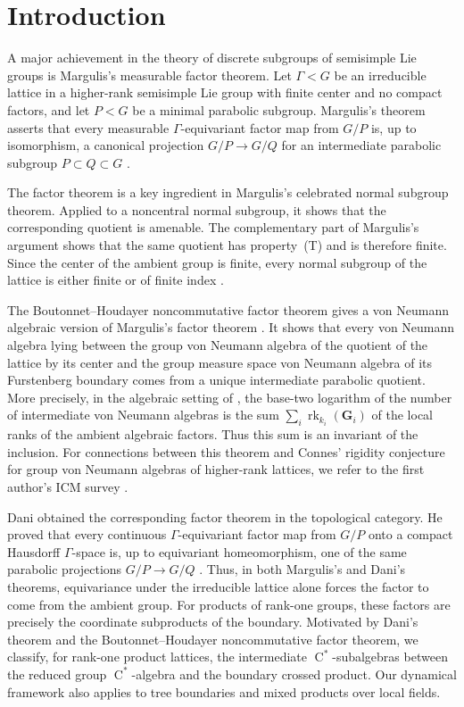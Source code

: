 \documentclass[11pt]{amsart}
\numberwithin{equation}{section}
\newcommand{\rC}{\operatorname{C}}
\newcommand{\rk}{\operatorname{rk}}
\theoremstyle{definition}
\begin{document}
	\section{Introduction}
	
	A major achievement in the theory of discrete subgroups of semisimple Lie
	groups is Margulis's measurable factor theorem. Let $\Gamma<G$ be an
	irreducible lattice in a higher-rank semisimple Lie group with finite center and
	no compact factors, and let $P<G$ be a minimal parabolic subgroup. Margulis's
	theorem asserts that every measurable $\Gamma$-equivariant factor map from
	$G/P$ is, up to isomorphism, a canonical projection $G/P\to G/Q$ for an
	intermediate parabolic subgroup $P\subset Q\subset G$
	\cite[Theorem~IV.2.11(a)]{Ma91}.

	The factor theorem is a key ingredient in Margulis's celebrated normal subgroup
	theorem. Applied to a noncentral normal subgroup, it shows that the corresponding
	quotient is amenable. The complementary part of Margulis's argument shows that
	the same quotient has property~{\rm (T)} and is therefore finite. Since the
	center of the ambient group is finite, every normal subgroup of the lattice is
	either finite or of finite index \cite[Theorem~IV.4.9]{Ma91}.

	The Boutonnet--Houdayer noncommutative factor theorem gives a von Neumann
	algebraic version of Margulis's factor theorem
	\cite[Theorem~B and Theorem~3.3]{BH23}. It shows that every
	von Neumann algebra lying between the group von Neumann algebra of the
	quotient of the lattice by its center and the group measure space von Neumann
	algebra of its Furstenberg boundary comes from a unique intermediate parabolic
	quotient. More precisely, in the algebraic setting of \cite{BH23}, the base-two
	logarithm of the number of intermediate von Neumann algebras is the sum
	\(\sum_i\rk_{k_i}(\mathbf G_i)\) of the local ranks of the ambient algebraic
	factors. Thus this sum is an invariant of
	the inclusion. For connections between this theorem and Connes'\! rigidity
	conjecture for group von Neumann algebras of higher-rank lattices, we refer to
	the first author's ICM survey
	\cite[Section~5]{Ho23}.

	Dani obtained the corresponding factor theorem in the topological category. He
	proved that every continuous $\Gamma$-equivariant factor map from $G/P$ onto a
	compact Hausdorff $\Gamma$-space is, up to equivariant homeomorphism, one of the
	same parabolic projections $G/P\to G/Q$ \cite[Theorem~A]{Da84}. Thus, in both
	Margulis's and Dani's theorems, equivariance under the irreducible lattice alone
	forces the factor to come from the ambient group. For products of rank-one
	groups, these factors are precisely the coordinate subproducts of the boundary.
	Motivated by Dani's theorem and the Boutonnet--Houdayer
	noncommutative factor theorem, we classify, for rank-one product lattices, the
	intermediate \(\rC^*\)-subalgebras between the reduced group \(\rC^*\)-algebra and
	the boundary crossed product.
	Our dynamical framework also applies to tree boundaries and mixed products over
	local fields.
	
\end{document}
